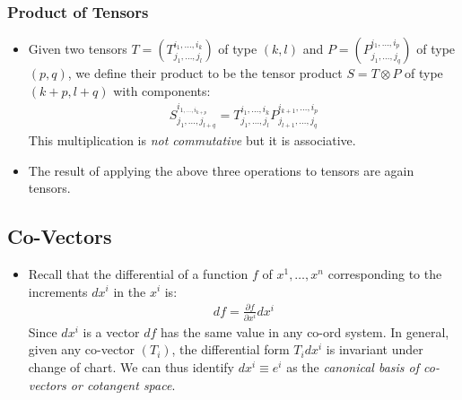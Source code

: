 \documentclass[11pt]{article}
\numberwithin{equation}{section}
\begin{document}
\subsubsection{Product of Tensors}
\begin{itemize}
  \item Given two tensors $T = \left(T^{i_1,\ldots,i_k}_{j_1,\ldots,j_l}\right)$ of type $(k,l)$ and $P = \left(P^{i_1,\ldots,i_p}_{j_1,\ldots,j_q}\right)$ of type $(p,q)$, we define their product to be the tensor product $S = T \otimes P$ of type $(k+p,l+q)$ with components:
  \begin{align*}
    S^{i_{1,\ldots,i_{k+p}}}_{j_1,\ldots,j_{l+q}} = T^{i_1,\ldots,i_k}_{j_1,\ldots,j_l}P^{i_{k+1},\ldots,i_p}_{j_{l+1},\ldots,j_q}
  \end{align*}
  This multiplication is \emph{not commutative} but it is associative. 

\item The result of applying the above three operations to tensors are again tensors. 
\end{itemize}

\subsection{Co-Vectors}
\begin{itemize}
  \item Recall that the differential of a function $f$ of $x^{1},\ldots,x^n$ corresponding to the increments $dx^i$ in the $x^i$ is:
  \begin{align*}
    df = \frac{\partial f}{\partial x^i}dx^i
  \end{align*}
  Since $dx^i$ is a vector $df$ has the same value in any co-ord system. 
  In general, given any co-vector $(T_i)$, the differential form $T_idx^i$ is invariant under change of chart. We can thus identify $dx^i \equiv e^{i}$ as the \emph{canonical basis of co-vectors or cotangent space}. 
\end{itemize}
\end{document}
